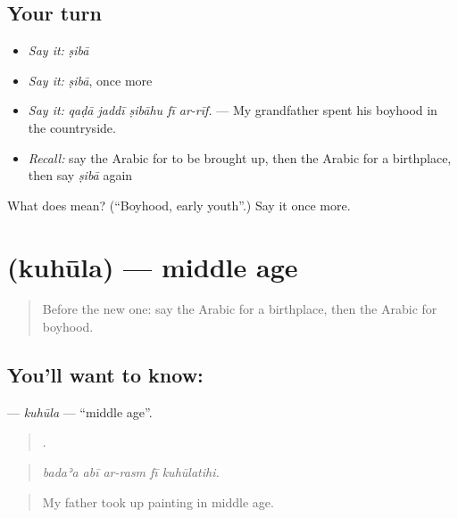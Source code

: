 \subsection*{Your turn}
\begin{itemize}
\raggedright
  \item \emph{Say it:} \emph{ṣibā}
  \item \emph{Say it:} \emph{ṣibā}, once more
  \item \emph{Say it:} \emph{qaḍā jaddī ṣibāhu fī ar-rīf.} — My grandfather spent his boyhood in the countryside.
  \item \emph{Recall:} say the Arabic for to be brought up, then the Arabic for a birthplace, then say \emph{ṣibā} again
\end{itemize}

\begin{tcolorbox}[breakable,colback=teal!4,colframe=teal!35!black,title={Before you move on}]
What does  mean? (\textquotedblleft{}Boyhood, early youth\textquotedblright{}.) Say it once more.
\end{tcolorbox}
\section[\texorpdfstring{\ar{كهولة} (kuhūla)}{كهولة (kuhūla)}]{ (kuhūla) — middle age}

\label{lesson:AR-C323-kuhula}



\begin{quote}
Before the new one: say the Arabic for a birthplace, then the Arabic for boyhood.
\end{quote}

\subsection*{You'll want to know: }
\textbf{} — \emph{kuhūla} — \textquotedblleft{}middle age\textquotedblright{}.

\begin{quote}
    .
\end{quote}

\begin{quote}
\emph{badaʾa abī ar-rasm fī kuhūlatihi.}
\end{quote}

\begin{quote}
My father took up painting in middle age.
\end{quote}

